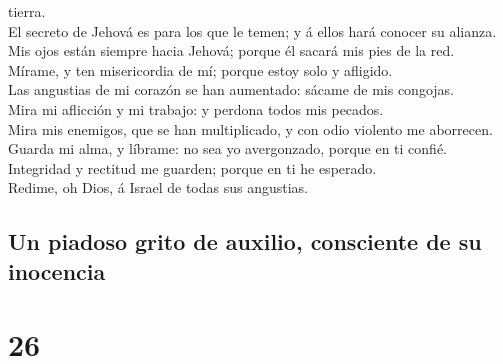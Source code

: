 tierra.\\
 El secreto de Jehová es para los que le temen; y á ellos
hará conocer su alianza.\\
 Mis ojos están siempre hacia Jehová; porque él sacará
mis pies de la red.\\
 Mírame, y ten misericordia de mí; porque estoy solo y
afligido.\\
 Las angustias de mi corazón se han aumentado: sácame de
mis congojas.\\
 Mira mi aflicción y mi trabajo: y perdona todos mis
pecados.\\
 Mira mis enemigos, que se han multiplicado, y con odio
violento me aborrecen.\\
 Guarda mi alma, y líbrame: no sea yo avergonzado, porque
en ti confié.\\
 Integridad y rectitud me guarden; porque en ti he
esperado.\\
 Redime, oh Dios, á Israel de todas sus angustias.

\hypertarget{un-piadoso-grito-de-auxilio-consciente-de-su-inocencia}{%
\subsection{Un piadoso grito de auxilio, consciente de su
inocencia}\label{un-piadoso-grito-de-auxilio-consciente-de-su-inocencia}}

\hypertarget{section-19-26}{%
\section{26}\label{section-19-26}}

